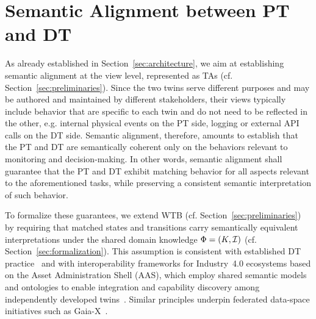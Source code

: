 \section{Semantic Alignment between PT and DT}\label{sec:formal_model}



As already established in Section~\ref{sec:architecture}, we aim at establishing semantic alignment at the view level, represented as TAs (cf. Section~\ref{sec:preliminaries}). Since the two twins serve different purposes and may be authored and maintained by different stakeholders, their views typically include behavior that are specific to each twin and do not need to be reflected in the other, e.g. internal physical events on the PT side, logging or external API calls on the DT side. Semantic alignment, therefore, amounts to establish that the PT and DT are semantically coherent only on the behaviors relevant to monitoring and decision-making. In other words, semantic alignment shall guarantee that the PT and DT exhibit matching behavior for all aspects relevant to the aforementioned tasks, while preserving a consistent semantic interpretation of such behavior. 

To formalize these guarantees, we extend WTB (cf. Section~\ref{sec:preliminaries}) by requiring that matched states and transitions carry semantically equivalent interpretations under the shared domain knowledge $\Phi = (K, \mathcal{I})$ (cf. Section~\ref{sec:formalization}). This assumption is consistent with established DT practice~\cite{Gil2025,KARABULUT2024442} and with interoperability frameworks for Industry~4.0 ecosystems based on the Asset Administration Shell (AAS), which employ shared semantic models and ontologies to enable integration and capability discovery among independently developed twins~\cite{grangel2023aasinterop,GrangelGonzalez2016,Arm2021AAS}. Similar principles underpin federated data-space initiatives such as Gaia-X~\cite{Gaiax2020}.




